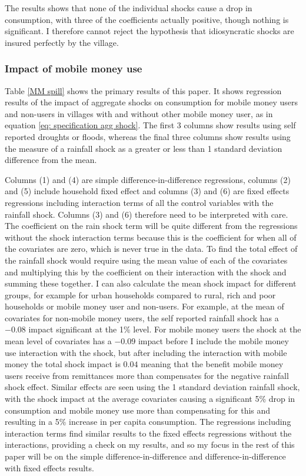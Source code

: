 The results shows that none of the individual shocks cause a drop in consumption, with three of the coefficients actually positive, though nothing is significant. I therefore cannot reject the hypothesis that idiosyncratic shocks are insured perfectly by the village. 



\subsubsection{Impact of mobile money use}
Table \ref{MM spill} shows the primary results of this paper. It shows regression results of the impact of aggregate shocks on consumption for mobile money users and non-users in villages with and without other mobile money user, as in equation \eqref{eq: specification agg shock}. The first 3 columns show results using self reported droughts or floods, whereas the final three columns show results using the measure of a rainfall shock as a greater or less than 1 standard deviation difference from the mean. 

Columns (1) and (4) are simple difference-in-difference regressions, columns (2) and (5) include household fixed effect  and columns (3) and (6) are fixed effects regressions including interaction terms of all the control variables with the rainfall shock. Columns (3) and (6) therefore need to be interpreted with care. The coefficient on the rain shock term will be quite different from the regressions without the shock interaction terms because this is the coefficient for when all of the covariates are zero, which is never true in the data. To find the total effect of the rainfall shock  would require using the mean value of each of the covariates and multiplying this by the coefficient on their interaction with the shock and summing these together. I can also calculate the mean shock impact for different groups, for example for urban households compared to rural, rich and poor households or mobile money user and non-users. For example, at the mean of covariates for non-mobile money users, the self reported rainfall shock has a $-0.08$ impact significant at the 1\% level. For mobile money users the shock at the mean level of covariates has a $-0.09$ impact before I include the mobile money use interaction with the shock, but after including the interaction with mobile money the total shock impact is $0.04$ meaning that the benefit mobile money users receive from remittances more than compensates for the negative rainfall shock effect.  Similar effects are seen using the 1 standard deviation rainfall shock, with the shock impact at the average covariates causing a significant 5\% drop in consumption and mobile money use more than compensating for this and resulting in a 5\% increase in per capita consumption.  The regressions including interaction terms find similar results to the fixed effects regressions without the interactions, providing a check on my results, and so my focus in the rest of this paper will be on the simple difference-in-difference and difference-in-difference with fixed effects results. 

